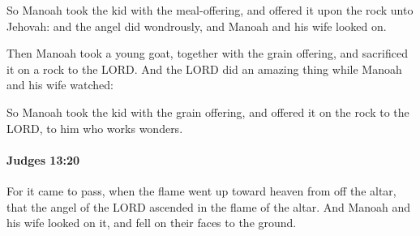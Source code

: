 			\begin{versebox}
					\item[BHS] 
					\item[ASV] So Manoah took the kid with the meal-offering, and offered it upon the rock unto Jehovah: and the angel did wondrously, and Manoah and his wife looked on.
					\item[NIV] Then Manoah took a young goat, together with the grain offering, and sacrificed it on a rock to the LORD. And the LORD did an amazing thing while Manoah and his wife watched:
					\item[NRSV] So Manoah took the kid with the grain offering, and offered it on the rock to the LORD, to him who works wonders.
			\end{versebox}

		\paragraph{Judges 13:20} %
			\label{JUDGES-13-20}

			For it came to pass, when the flame went up toward heaven from off the altar, that the angel of the LORD ascended in the flame of the altar. And Manoah and his wife looked on it, and fell on their faces to the ground.

